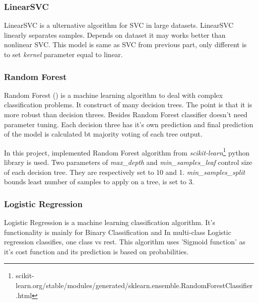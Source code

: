 \subsubsection{LinearSVC}
LinearSVC is a ulternative algorithm for SVC in large datasets. LinearSVC linearly separates samples. Depends on dataset it may works better than nonlinear SVC. This model is same as SVC from previous part, only different is to set \textit{kernel} parameter equal to linear. 
 
\subsubsection{Random Forest}
Random Forest (\cite{randomforest}) is a machine learning algorithm to deal with complex classification problems. It construct of many decision trees. The point is that it is more robust than decision threes. Besides Random Forest classifier doesn't need parameter tuning. Each decision three has it's own prediction and final prediction of the model is calculated bt majority voting of each tree output. 

In this project, implemented Random Forest algorithm from \textit{scikit-learn}\footnote{scikit-learn.org/stable/modules/generated/sklearn.ensemble.RandomForestClassifier.html} python library is used. Two parameters of \textit{max\_depth} and \textit{min\_samples\_leaf} control size of each decision tree. They are respectively set to 10 and 1. \textit{min\_samples\_split} bounds least number of samples to apply on a tree, is set to 3. 

\subsubsection{Logistic Regression}
Logistic Regression is a machine learning classification algorithm. It's functionality is mainly for Binary Classification and In multi-class Logistic regression classifies, one class vs rest. This algorithm uses 'Sigmoid function' as it's cost function and its prediction is based on probabilities. 

